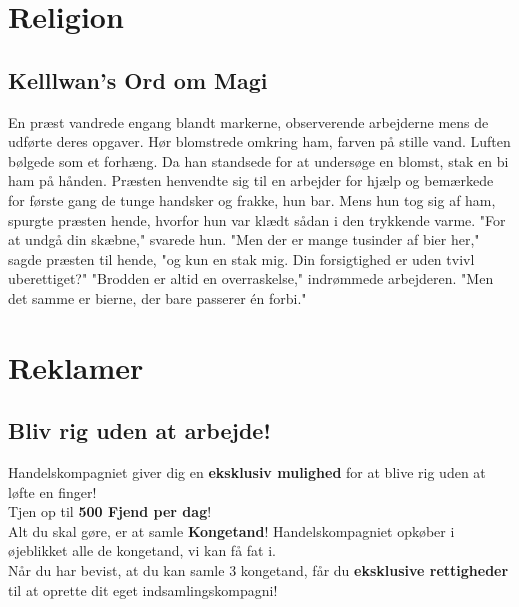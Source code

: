 \documentclass[letterpaper,12pt]{memoir}
\begin{document}
\subsection*{}

\section*{Religion}
\subsection*{Kelllwan's Ord om Magi}
En præst vandrede engang blandt markerne, observerende arbejderne mens de udførte deres opgaver. Hør blomstrede omkring ham, farven på stille vand. Luften bølgede som et forhæng. Da han standsede for at undersøge en blomst, stak en bi ham på hånden. Præsten henvendte sig til en arbejder for hjælp og bemærkede for første gang de tunge handsker og frakke, hun bar. Mens hun tog sig af ham, spurgte præsten hende, hvorfor hun var klædt sådan i den trykkende varme. "For at undgå din skæbne," svarede hun. "Men der er mange tusinder af bier her," sagde præsten til hende, "og kun en stak mig. Din forsigtighed er uden tvivl uberettiget?" "Brodden er altid en overraskelse," indrømmede arbejderen. "Men det samme er bierne, der bare passerer én forbi."

\section*{Reklamer}

\subsection*{Bliv rig uden at arbejde!}

Handelskompagniet giver dig en \textbf{eksklusiv mulighed} for at blive rig uden at løfte en finger! \\[0.5em]

Tjen op til \textbf{500 Fjend per dag}! \\[0.5em]

Alt du skal gøre, er at samle \textbf{Kongetand}! Handelskompagniet opkøber i øjeblikket alle de kongetand, vi kan få fat i. \\[0.5em]

Når du har bevist, at du kan samle 3 kongetand, får du \textbf{eksklusive rettigheder} til at oprette dit eget indsamlingskompagni! \\[1em]
\end{document}
